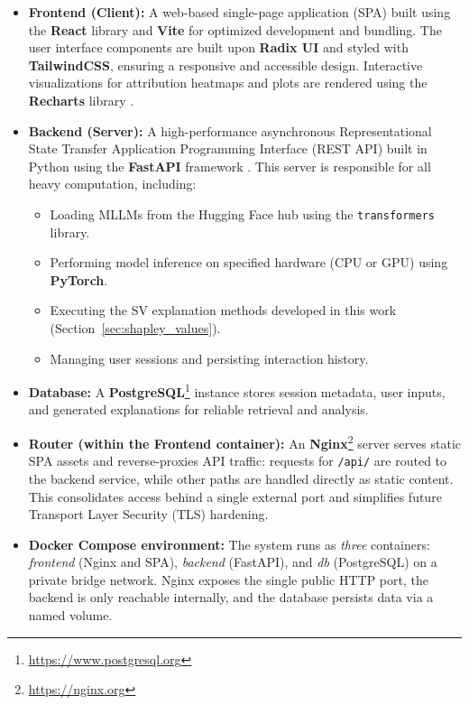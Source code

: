 \begin{appendices}
\begin{itemize}
        \item \textbf{Frontend (Client):} A web-based single-page application (SPA) built using the \textbf{React} library \parencite{facebook2013react} and \textbf{Vite} \parencite{vite2020} for optimized development and bundling. The user interface components are built upon \textbf{Radix UI} \parencite{radixui2020} and styled with \textbf{TailwindCSS}, ensuring a responsive and accessible design. Interactive visualizations for attribution heatmaps and plots are rendered using the \textbf{Recharts} library \parencite{recharts2018}.
        \item \textbf{Backend (Server):} A high-performance asynchronous Representational State Transfer Application Programming Interface (REST API) built in Python using the \textbf{FastAPI} framework \parencite{tiangolo2018fastapi}. This server is responsible for all heavy computation, including:

        \begin{itemize}
            \item Loading MLLMs from the Hugging Face hub using the \texttt{transformers} library.
            \item Performing model inference on specified hardware (CPU or GPU) using \textbf{PyTorch}.
            \item Executing the SV explanation methods developed in this work (Section~\ref{sec:shapley_values}).
            \item Managing user sessions and persisting interaction history.
        \end{itemize}

       \item \textbf{Database:} A \textbf{PostgreSQL}\footnote{\url{https://www.postgresql.org}} instance stores session metadata, user inputs, and generated explanations for reliable retrieval and analysis.

        \item \textbf{Router (within the Frontend container):} An \textbf{Nginx}\footnote{\url{https://nginx.org}} server serves static SPA assets and reverse-proxies API traffic: requests for \texttt{/api/\*} are routed to the backend service, while other paths are handled directly as static content. This consolidates access behind a single external port and simplifies future Transport Layer Security (TLS) hardening.

        \item \textbf{Docker Compose environment:} The system runs as \emph{three} containers: \emph{frontend} (Nginx and SPA), \emph{backend} (FastAPI), and \emph{db} (PostgreSQL) on a private bridge network. Nginx exposes the single public HTTP port, the backend is only reachable internally, and the database persists data via a named volume.


\end{itemize}
\end{appendices}
